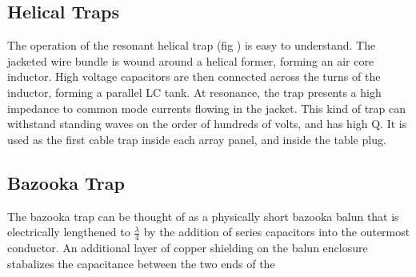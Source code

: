 \subsection{Helical Traps}
The operation of the resonant helical trap (fig \cite{helical_trap}) is easy to understand.  The jacketed wire bundle is
wound around a helical former, forming an air core inductor. High voltage capacitors are then connected across the turns
of the inductor, forming a parallel LC tank. At resonance, the trap presents a high impedance to common mode currents flowing in the jacket. 
This kind of trap can withstand standing waves on the order of hundreds of volts, and has high Q. It is used as the first cable trap inside each array panel, and inside the table plug.

\subsection{Bazooka Trap}
The bazooka trap can be thought of as a physically short bazooka balun that is electrically lengthened to $\frac{\lambda}{4}$ by the addition of series capacitors into the outermost conductor. An additional layer of copper shielding on the balun enclosure stabalizes the capacitance between the two ends of the 
